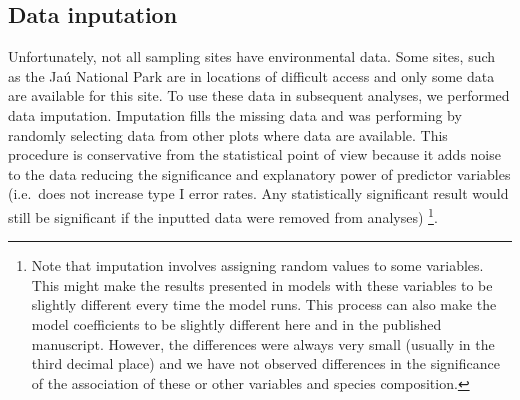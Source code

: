 \documentclass[]{article}
\newenvironment{Shaded}{\begin{snugshade}}{\end{snugshade}}
\newcommand{\CommentTok}[1]{\textcolor[rgb]{0.56,0.35,0.01}{\textit{#1}}}
\newcommand{\DataTypeTok}[1]{\textcolor[rgb]{0.13,0.29,0.53}{#1}}
\newcommand{\KeywordTok}[1]{\textcolor[rgb]{0.13,0.29,0.53}{\textbf{#1}}}
\newcommand{\NormalTok}[1]{#1}
\newcommand{\OperatorTok}[1]{\textcolor[rgb]{0.81,0.36,0.00}{\textbf{#1}}}
\newcommand{\OtherTok}[1]{\textcolor[rgb]{0.56,0.35,0.01}{#1}}
\begin{document}
\hypertarget{data-inputation}{%
\subsection{Data inputation}\label{data-inputation}}

Unfortunately, not all sampling sites have environmental data. Some
sites, such as the Jaú National Park are in locations of difficult
access and only some data are available for this site. To use these data
in subsequent analyses, we performed data imputation. Imputation fills
the missing data and was performing by randomly selecting data from
other plots where data are available. This procedure is conservative
from the statistical point of view because it adds noise to the data
reducing the significance and explanatory power of predictor variables
(i.e.~does not increase type I error rates. Any statistically
significant result would still be significant if the inputted data were
removed from analyses) \footnote{Note that imputation involves assigning
  random values to some variables. This might make the results presented
  in models with these variables to be slightly different every time the
  model runs. This process can also make the model coefficients to be
  slightly different here and in the published manuscript. However, the
  differences were always very small (usually in the third decimal
  place) and we have not observed differences in the significance of the
  association of these or other variables and species composition.}.

\begin{Shaded}
\end{Shaded}
\end{document}
